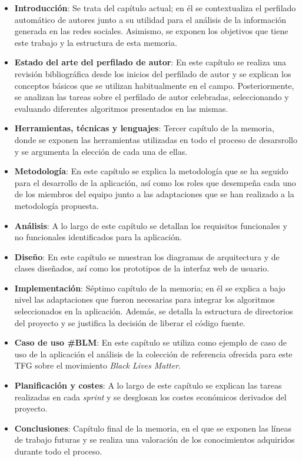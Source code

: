 \begin{itemize}
	\item \textbf{Introducción}: Se trata del capítulo actual; en él se contextualiza el perfilado automático de autores junto a su utilidad
	      para el análisis de la información generada en las redes sociales. Asimismo, se exponen los objetivos que tiene este trabajo y la estructura
	      de esta memoria.

	\item \textbf{Estado del arte del perfilado de autor}: En este capítulo se realiza una revisión bibliográfica desde los inicios del perfilado de autor y se explican
	      los conceptos básicos que se utilizan habitualmente en el campo. Posteriormente, se analizan las tareas sobre el perfilado de autor celebradas,
	      seleccionando y evaluando diferentes algoritmos presentados en las mismas.

	\item \textbf{Herramientas, técnicas y lenguajes}: Tercer capítulo de la memoria, donde se exponen las herramientas utilizadas en todo el proceso de desarsrollo
	      y se argumenta la elección de cada una de ellas.

	\item \textbf{Metodología}: En este capítulo se explica la metodología que se ha seguido para el desarrollo de la aplicación, así como
	      los roles que desempeña cada uno de los miembros del equipo junto a las adaptaciones que se han realizado a la metodología propuesta.

	\item \textbf{Análisis}: A lo largo de este capítulo se detallan los requisitos funcionales y no funcionales identificados para la aplicación.

	\item \textbf{Diseño}: En este capítulo se muestran los diagramas de arquitectura y de clases diseñados, así como los prototipos de la interfaz web de usuario.

	\item \textbf{Implementación}: Séptimo capítulo de la memoria; en él se explica a bajo nivel las adaptaciones que fueron necesarias para integrar los algoritmos
	      seleccionados en la aplicación. Además, se detalla la estructura de directorios del proyecto y se justifica la decisión de liberar el código fuente.

	\item \textbf{Caso de uso \#BLM}: En este capítulo se utiliza como ejemplo de caso de uso de la aplicación el análisis de la colección de referencia ofrecida para este TFG
	      sobre el movimiento \textit{Black Lives Matter}.

	\item \textbf{Planificación y costes}: A lo largo de este capítulo se explican las tareas realizadas en cada \textit{sprint} y se desglosan los costes
	      económicos derivados del proyecto.

	\item \textbf{Conclusiones}: Capítulo final de la memoria, en el que se exponen las líneas de trabajo futuras y se realiza una valoración de los conocimientos
	      adquiridos durante todo el proceso.

\end{itemize}
